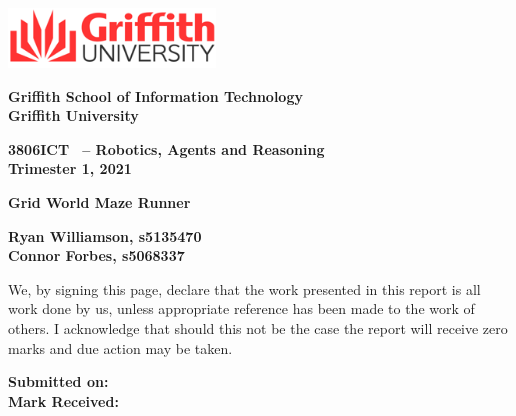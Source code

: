\documentclass[twoside, 12pt, a4paper]{article}
\newenvironment{myindentpar}[1]%
{\begin{list}{}%
		{\setlength{\leftmargin}{#1}}%
		\item[]%
	}
	{\end{list}}
\begin{document}
\begin{titlepage}
\begin{flushright}
	\includegraphics[height=60px]{griffithlogo.png}
\end{flushright}
\begin{large}
\textbf{Griffith School of Information Technology}\\
\textbf{Griffith University}

\vspace*{8mm}

\textbf{3806ICT \, -- Robotics, Agents and Reasoning}\\
\textbf{Trimester 1, 2021}
\end{large}

\vspace*{15mm}

\begin{Huge}
\textbf{Grid World Maze Runner}
\end{Huge}

\vspace*{5mm}
\begin{large}


\vspace*{8mm}

\textbf{Ryan Williamson, s5135470}\\
\textbf{Connor Forbes, s5068337}

\vspace*{8mm}
\begin{myindentpar}{2cm}
 We, by signing this page, declare that the work presented in this report is all work done by us, unless appropriate reference has been made to the work of others. I acknowledge that should this not be the case the report will receive zero marks and due action may be taken.
\end{myindentpar}

\vspace{20mm}
\textbf{Submitted on: \underline{\hspace{50mm}  } }\\

\textbf{Mark Received: \underline{\hspace{50mm}  }  }

\end{large}


\vfill

\end{titlepage}
\end{document}
